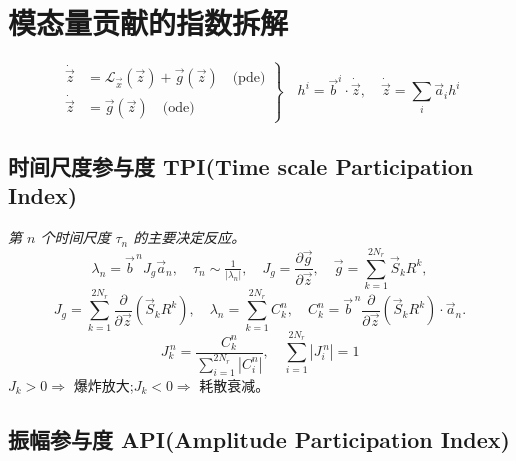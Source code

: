 \documentclass[11pt,a4paper]{article}
\newcommand{\Jg}{J_{\!g}}
\newcommand{\pdiff}[2]{\dfrac{\partial #1}{\partial #2}}
\begin{document}
\section{模态量贡献的指数拆解}

\begin{equation}
	\left.
	\begin{aligned}
		\dot{\vec{z}} &= \mathcal{L}_{\vec{x}}(\vec{z}) + \vec{g}(\vec{z}) \quad \text{(pde)} \\
		\dot{\vec{z}} &= \vec{g}(\vec{z}) \quad \text{(ode)}
	\end{aligned}
	\right\}
	\quad h^i = \vec{b}^i \cdot \dot{\vec{z}},\quad \dot {\vec{z}}=\sum_{i}\vec a_ih^i
\end{equation}


\subsection{时间尺度参与度 TPI(Time scale Participation Index)}

\emph{第 $n$ 个时间尺度 $\tau_n$ 的主要决定反应。}
\begin{equation}
\lambda_n=\vec b^{\,n}\Jg\vec a_n,\quad \tau_n\sim\tfrac{1}{|\lambda_n|},\quad
\Jg=\pdiff{\vec g}{\vec z},\quad \vec g=\sum_{k=1}^{2N_r}\vec S_k R^{k},
\end{equation}
\[
\Jg=\sum_{k=1}^{2N_r}\pdiff{}{\vec z}(\vec S_k R^{k}),\quad
\lambda_n=\sum_{k=1}^{2N_r}C^{n}_{k},\quad
C^{n}_{k}=\vec b^{\,n}\pdiff{}{\vec z}(\vec S_k R^{k})\cdot\vec a_n.
\]
\begin{equation}
\boxed{\;J^{\,n}_{k}=\frac{C^{n}_{k}}{\sum_{i=1}^{2N_r}|C^{n}_{i}|},\quad
\sum_{i=1}^{2N_r}|J^{\,n}_{i}|=1\;}
\end{equation}
$J_k>0\Rightarrow$ 爆炸放大;$J_k<0\Rightarrow$ 耗散衰减。

\subsection{振幅参与度 API(Amplitude Participation Index)}
\end{document}
